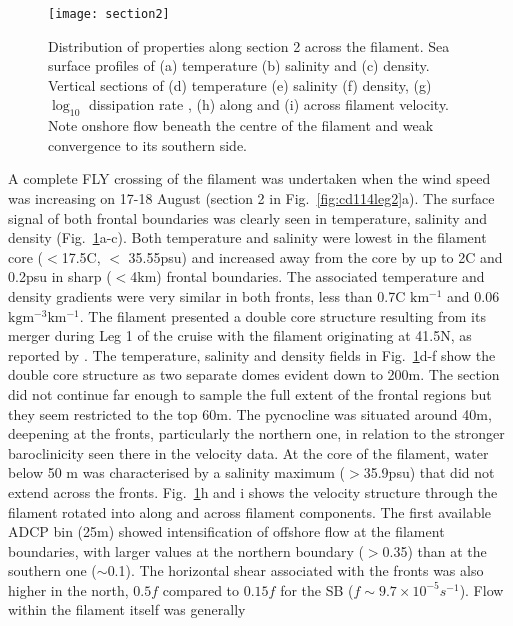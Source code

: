 \begin{figure}[t]
\begin{widefig}{-1cm}{-1cm}
\centering %
\texttt{[image: section2]}%
\caption{Distribution of properties along section 2 across the
filament. Sea surface profiles of (a) temperature (b) salinity and
(c) density. Vertical sections of (d) temperature (e) salinity (f)
density, (g) $\log_{10}$ dissipation rate , (h) along and (i)
across filament velocity. Note onshore flow beneath the centre of
the
filament and weak convergence to its southern side.}%
\label{fig:cd114section2}%
\end{widefig}
\end{figure}
A complete FLY crossing of the filament was undertaken when the
wind speed was increasing on 17-18 August (section 2 in
Fig.~\ref{fig:cd114leg2}a). The surface signal of both frontal
boundaries was clearly seen in temperature, salinity and density
(Fig.~\ref{fig:cd114section2}a-c). Both temperature and salinity
were lowest in the filament core ($<$17.5\deg C, $<$ 35.55psu) and
increased away from the core by up to 2\deg C and 0.2psu in sharp
($<$4km) frontal boundaries. The associated temperature and
density gradients were very similar in both fronts, less than
0.7\deg C $\mathrm{km^{-1}}$ and 0.06 $\mathrm{kg m^{-3}
km^{-1}}$. The filament presented a double core structure
resulting from its merger during Leg 1 of the cruise with the
filament originating at 41.5\deg N, as reported by
\citet{Smyth01}. The temperature, salinity and density fields in
Fig.~\ref{fig:cd114section2}d-f show the double core structure as
two separate domes evident down to 200m. The section did not
continue far enough to sample the full extent of the frontal
regions but they seem restricted to the top 60m. The pycnocline
was situated around 40m, deepening at the fronts, particularly the
northern one, in relation to the stronger baroclinicity seen there
in the velocity data. At the core of the filament, water below 50
m was characterised by a salinity maximum ($>$35.9psu) that did
not extend across the fronts. Fig.~\ref{fig:cd114section2}h and i
shows the velocity structure through the filament rotated into
along and across filament components. The first available ADCP bin
(25m) showed intensification of offshore flow at the filament
boundaries, with larger values at the northern boundary
($>$0.35\vel ) than at the southern one ($\sim$0.1\vel ). The
horizontal shear associated with the fronts was also higher in the
north, $0.5f$ compared to $0.15f$ for the SB ($f\sim 9.7 \times
10^{-5}s^{-1}$). Flow within the filament itself was generally
